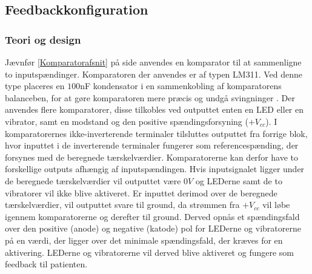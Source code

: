 \subsection{Feedbackkonfiguration}
\subsubsection{Teori og design} \label{Afs_Komparator}
Jævnfør \ref{Komparatorafsnit} på side \pageref{Komparatorafsnit} anvendes en komparator til at sammenligne to inputspændinger. Komparatoren der anvendes er af typen LM311. Ved denne type placeres en $100$nF kondensator i en sammenkobling af komparatorens balanceben, for at gøre komparatoren mere præcis og undgå svingninger \cite{Instruments2015}. Der anvendes flere komparatorer, disse tilkobles ved outputtet enten en LED eller en vibrator, samt en modstand og den positive spændingsforsyning ($+V_{cc}$). I komparatorernes ikke-inverterende terminaler tilsluttes outputtet fra forrige blok, hvor inputtet i de inverterende terminaler fungerer som referencespænding, der forsynes med de beregnede tærskelværdier. Komparatorerne kan derfor have to forskellige outputs afhængig af inputspændingen. Hvis inputsignalet ligger under de beregnede tærskelværdier vil outputtet være $0V$ og LEDerne samt de to vibratorer vil ikke blive aktiveret. Er inputtet derimod over de beregnede tærskelværdier, vil outputtet svare til ground, da strømmen fra $+V_{cc}$ vil løbe igennem komparatorerne og derefter til ground. Derved opnås et spændingsfald over den positive (anode) og negative (katode) pol for LEDerne og vibratorerne på en værdi, der ligger over det minimale spændingsfald, der kræves for en aktivering. LEDerne og vibratorerne vil derved blive aktiveret og fungere som feedback til patienten. \\


